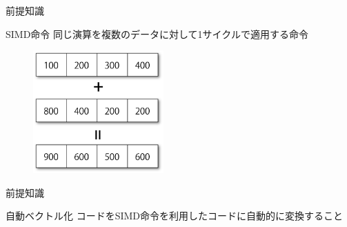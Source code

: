 \documentclass[14pt,dvipdfmx]{beamer}
\theoremstyle{definition}
\begin{document}
\begin{frame}{前提知識}
  \begin{block}{SIMD命令}
    同じ演算を複数のデータに対して1サイクルで適用する命令
  \end{block}
  \begin{figure}[ht]
    \centering
    \includegraphics[width=50mm]{./img/figure2.png}
  \end{figure}
\end{frame}

\begin{frame}{前提知識}
  \begin{block}{自動ベクトル化}
    コードをSIMD命令を利用したコードに自動的に変換すること
  \end{block}
\end{frame}
\end{document}
